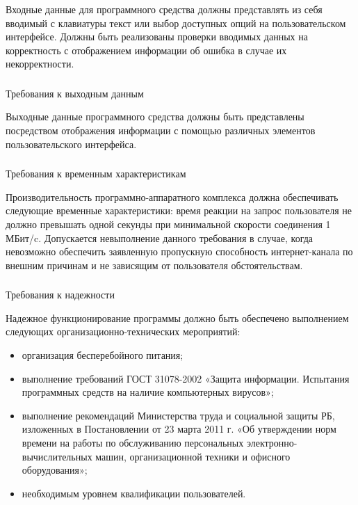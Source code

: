 Входные данные для программного средства должны представлять из себя вводимый с клавиатуры текст или выбор доступных опций на пользовательском интерфейсе.
Должны быть реализованы проверки вводимых данных на корректность с отображением информации об ошибка в случае их некорректности.

\subsubsection{} Требования к выходным данным
\label{sec:analysis:requirements:output}

Выходные данные программного средства должны быть представлены посредством отображения информации с помощью различных элементов пользовательского интерфейса.

\subsubsection{} Требования к временным характеристикам
\label{sec:analysis:requirements:time}

Производительность программно-аппаратного комплекса должна \linebreak обеспечивать следующие временные характеристики: время реакции на запрос пользователя не должно
превышать одной секунды при минимальной скорости соединения 1 МБит/c. Допускается невыполнение данного требования в случае, когда невозможно обеспечить заявленную
пропускную способность интернет-канала по внешним причинам и не зависящим от пользователя обстоятельствам.

\subsubsection{} Требования к надежности
\label{sec:analysis:requirements:reliability}

Надежное функционирование программы должно быть обеспечено выполнением следующих организационно-технических мероприятий:

\begin{itemize}
	\item организация бесперебойного питания;
	\item выполнение требований ГОСТ 31078-2002 «Защита информации. Испытания программных средств на наличие компьютерных вирусов»;
	\item выполнение рекомендаций Министерства труда и социальной защиты РБ, изложенных в Постановлении от 23 марта 2011 г. «Об утверждении норм времени на работы по обслуживанию персональных электронно-вычислительных машин, организационной техники и офисного оборудования»;
	\item необходимым уровнем квалификации пользователей.
\end{itemize} 

